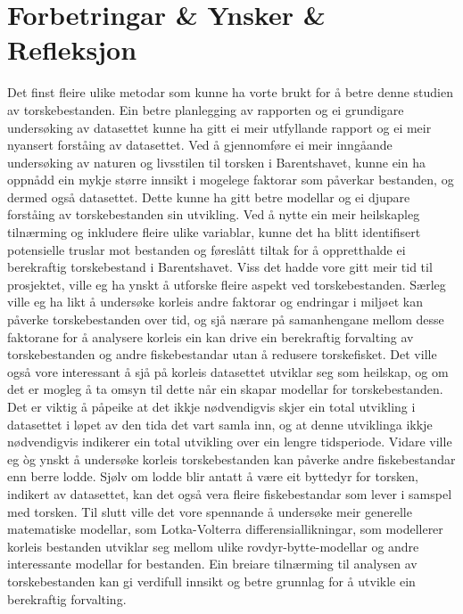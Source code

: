 \documentclass{report}
\begin{document}
\chapter{Forbetringar \& Ynsker \& Refleksjon}
Det finst fleire ulike metodar som kunne ha vorte brukt for å betre denne studien av torskebestanden. Ein betre planlegging av rapporten og ei grundigare undersøking av datasettet kunne ha gitt ei meir utfyllande rapport og ei meir nyansert forståing av datasettet. Ved å gjennomføre ei meir inngåande undersøking av naturen og livsstilen til torsken i Barentshavet, kunne ein ha oppnådd ein mykje større innsikt i mogelege faktorar som påverkar bestanden, og dermed også datasettet. Dette kunne ha gitt betre modellar og ei djupare forståing av torskebestanden sin utvikling.
Ved å nytte ein meir heilskapleg tilnærming og inkludere fleire ulike variablar, kunne det ha blitt identifisert potensielle truslar mot bestanden og føreslått tiltak for å oppretthalde ei berekraftig torskebestand i Barentshavet.
Viss det hadde vore gitt meir tid til prosjektet, ville eg ha ynskt å utforske fleire aspekt ved torskebestanden. Særleg ville eg ha likt å undersøke korleis andre faktorar og endringar i miljøet kan påverke torskebestanden over tid, og sjå nærare på samanhengane mellom desse faktorane for å analysere korleis ein kan drive ein berekraftig forvalting av torskebestanden og andre fiskebestandar utan å redusere torskefisket. Det ville også vore interessant å sjå på korleis datasettet utviklar seg som heilskap, og om det er mogleg å ta omsyn til dette når ein skapar modellar for torskebestanden. Det er viktig å påpeike at det ikkje nødvendigvis skjer ein total utvikling i datasettet i løpet av den tida det vart samla inn, og at denne utviklinga ikkje nødvendigvis indikerer ein total utvikling over ein lengre tidsperiode.
Vidare ville eg òg ynskt å undersøke korleis torskebestanden kan påverke andre fiskebestandar enn berre lodde. Sjølv om lodde blir antatt å være eit byttedyr for torsken, indikert av datasettet, kan det også vera fleire fiskebestandar som lever i samspel med torsken. Til slutt ville det vore spennande å undersøke meir generelle matematiske modellar, som Lotka-Volterra differensiallikningar, som modellerer korleis bestanden utviklar seg mellom ulike rovdyr-bytte-modellar og andre interessante modellar for bestanden. Ein breiare tilnærming til analysen av torskebestanden kan gi verdifull innsikt og betre grunnlag for å utvikle ein berekraftig forvalting.
\end{document}
